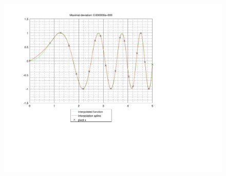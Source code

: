 \documentclass[titlepage]{article}
\begin{document}
\begin{figure}[h]
\hspace{-3cm}\includegraphics[page=2]{../result.pdf}
\end{figure}
\end{document}
